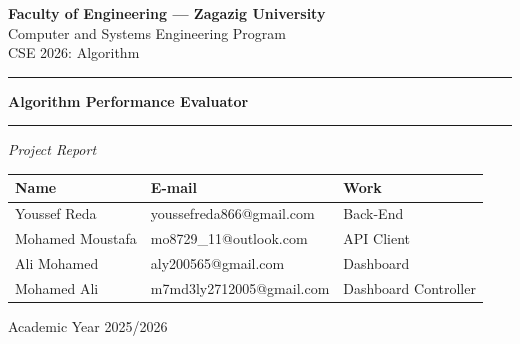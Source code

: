 \documentclass[12pt]{article}
\begin{document}
\thispagestyle{empty}

\begin{center}

{\large \textbf{Faculty of Engineering --- Zagazig University}}\\
{\large Computer and Systems Engineering Program}\\[0.3cm]
{\small CSE 2026: Algorithm}

\vspace{0.5cm}
\rule{\textwidth}{0.5pt}

\vspace{0.5cm}

{\LARGE \textbf{Algorithm Performance Evaluator}}

\vspace{0.5cm}

\rule{\textwidth}{0.5pt}

\vspace{1cm}

{\large \textit{Project Report}}

\vspace{1cm}

\end{center}

\begin{center}
\renewcommand{\arraystretch}{1.5}
\begin{tabular}{|p{4.5cm}|p{6cm}|p{5cm}|}
\hline
\textbf{Name} & \textbf{E-mail} & \textbf{Work} \\
\hline

Youssef Reda & youssefreda866@gmail.com & Back-End \\
\hline
Mohamed Moustafa & mo8729\_11@outlook.com & API Client \\
\hline
Ali Mohamed & aly200565@gmail.com & Dashboard \\
\hline
Mohamed Ali & m7md3ly2712005@gmail.com & Dashboard Controller \\
\hline

\end{tabular}
\end{center}

\vfill

\begin{center}
Academic Year 2025/2026
\end{center}

\newpage

\thispagestyle{empty}
\tableofcontents
\newpage
\end{document}
